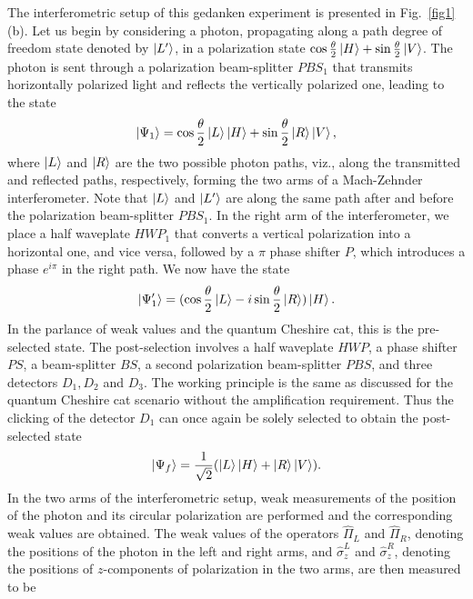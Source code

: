 \documentclass[aps,pra,showpacs,twoside,twocolumn,10pt]{revtex4-1}
\begin{document}
The interferometric setup of this gedanken experiment is presented in Fig.~\ref{fig1}(b). Let us begin by considering a photon, propagating along a path degree of freedom state denoted by $\ket{L^\prime}$, in a polarization state $\cos\frac{\theta}{2}\ket{H}+ \sin\frac{\theta}{2}\ket{V}$.
The photon is sent through a polarization beam-splitter $PBS_1$ that transmits horizontally polarized light and reflects the vertically polarized one, leading to the state
\begin{equation}
    \ket{\Psi_1}=\cos\frac{\theta}{2}\ket{L}\ket{H}+ \sin\frac{\theta}{2}\ket{R}\ket{V},
\end{equation}
where $\ket{L}$ and $\ket{R}$ are the two possible photon paths, viz., along the transmitted and reflected paths, respectively, forming the two arms of a Mach-Zehnder interferometer. Note that $\ket{L}$ and $\ket{L^\prime}$ are along the same path after and before the polarization beam-splitter $PBS_1$. In the right arm of the interferometer, we place a half waveplate $HWP_1$ that converts a vertical polarization into a horizontal one, and vice versa, followed by a $\pi$ phase shifter $P$, which introduces a phase $e^{i\pi}$ in the right path. We now have the state
\begin{equation}
    \ket{\Psi^\prime_1}=(\cos\frac{\theta}{2}\ket{L}-i\sin\frac{\theta}{2}\ket{R})\ket{H} . 
    \label{eq: preselect}
\end{equation} 
In the parlance of weak values and the quantum Cheshire cat, this is the pre-selected state.  The post-selection involves a half waveplate $HWP$, a phase shifter $PS$, a beam-splitter $BS$, a second polarization beam-splitter $PBS$, and three detectors $D_1, D_2$ and $D_3$. The working principle is the same as discussed for the quantum Cheshire cat scenario without the amplification requirement. Thus the clicking of the detector $D_1$ can once again be solely selected to obtain the post-selected state
\begin{equation}
    \ket{\Psi_f}=\frac{1}{\sqrt{2}}(\ket{L}\ket{H}+\ket{R}\ket{V}).
    \label{eq:3}
\end{equation}
In the two arms of the interferometric setup, weak measurements of the position of the photon and its circular polarization are performed and the corresponding weak values are obtained. The weak values of the operators $\hat{\Pi}_L$ and $\hat{\Pi}_R$, denoting the positions of the photon in the left and right arms, and $\hat{\sigma}_z^{L}$ and $\hat{\sigma}_z^{R}$, denoting the positions of $z$-components of polarization in the two arms, are then measured to be  
\end{document}
